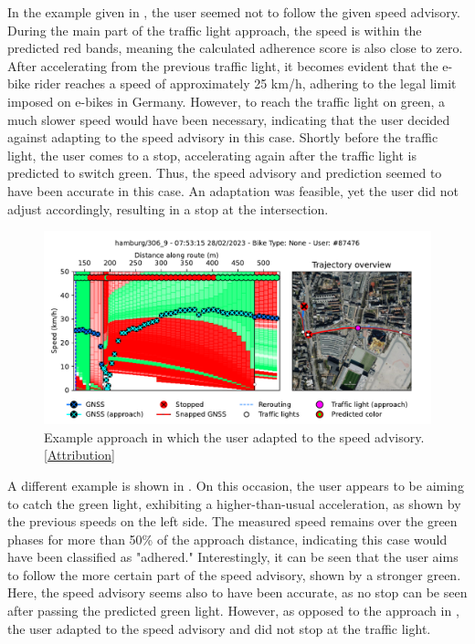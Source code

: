 In the example given in , the user seemed not to follow the given speed advisory. During the main part of the traffic light approach, the speed is within the predicted red bands, meaning the calculated adherence score is also close to zero. After accelerating from the previous traffic light, it becomes evident that the e-bike rider reaches a speed of approximately 25 km/h, adhering to the legal limit imposed on e-bikes in Germany. However, to reach the traffic light on green, a much slower speed would have been necessary, indicating that the user decided against adapting to the speed advisory in this case. Shortly before the traffic light, the user comes to a stop, accelerating again after the traffic light is predicted to switch green. Thus, the speed advisory and prediction seemed to have been accurate in this case. An adaptation was feasible, yet the user did not adjust accordingly, resulting in a stop at the intersection.

\begin{figure}[t]
\caption{Example approach in which the user adapted to the speed advisory. [\hyperref[attribution]{Attribution}]}\label{fig:example-trajectory-adapted}
\includegraphics[width=\linewidth]{images/example-trajectory-adapted.pdf}
\end{figure}

A different example is shown in . On this occasion, the user appears to be aiming to catch the green light, exhibiting a higher-than-usual acceleration, as shown by the previous speeds on the left side. The measured speed remains over the green phases for more than 50\% of the approach distance, indicating this case would have been classified as "adhered." Interestingly, it can be seen that the user aims to follow the more certain part of the speed advisory, shown by a stronger green. Here, the speed advisory seems also to have been accurate, as no stop can be seen after passing the predicted green light. However, as opposed to the approach in , the user adapted to the speed advisory and did not stop at the traffic light.

